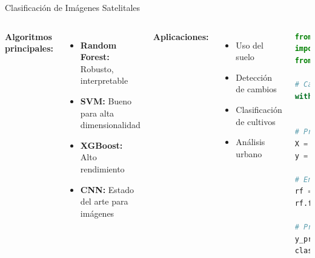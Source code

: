 \documentclass[10pt,aspectratio=169]{beamer}
\begin{document}
\begin{frame}{Clasificación de Imágenes Satelitales}
    \begin{columns}
        \textbf{Algoritmos principales:}
        \begin{itemize}
            \item \textbf{Random Forest:} Robusto, interpretable
            \item \textbf{SVM:} Bueno para alta dimensionalidad
            \item \textbf{XGBoost:} Alto rendimiento
            \item \textbf{CNN:} Estado del arte para imágenes
        \end{itemize}

        \vspace{3mm}
        \textbf{Aplicaciones:}
        \begin{itemize}
            \item Uso del suelo
            \item Detección de cambios
            \item Clasificación de cultivos
            \item Análisis urbano
        \end{itemize}

        \begin{lstlisting}[language=Python,basicstyle=\tiny]
from sklearn.ensemble import RandomForestClassifier
import rasterio
from rasterio.features import shapes

# Cargar imagen multiespectral
with rasterio.open('sentinel2.tif') as src:
    img = src.read()

# Preparar datos (bandas como features)
X = img.reshape(n_bands, -1).T
y = training_labels.ravel()

# Entrenar clasificador
rf = RandomForestClassifier(n_estimators=100)
rf.fit(X[train_idx], y[train_idx])

# Predicción
y_pred = rf.predict(X)
classified = y_pred.reshape(height, width)
        \end{lstlisting}
    \end{columns}
\end{frame}
\end{document}
